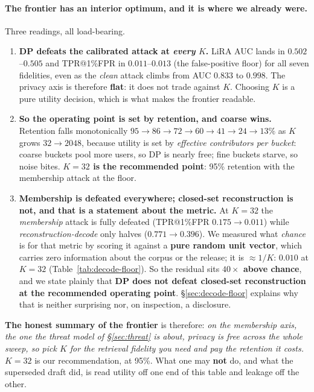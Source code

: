 \documentclass[pdflatex,sn-mathphys-num,iicol]{sn-jnl}
\theoremstyle{thmstyleone}%
\theoremstyle{thmstyletwo}%
\theoremstyle{thmstylethree}%
\newcommand{\secref}[1]{\S\ref{#1}}
\begin{document}
\paragraph{The frontier has an interior optimum, and it is where we already were.}
Three readings, all load-bearing.

\begin{enumerate}
  \item \textbf{DP defeats the calibrated attack at \emph{every} $K$.} LiRA AUC lands in
    $0.502$--$0.505$ and TPR@1\%FPR in $0.011$--$0.013$ (the false-positive floor)
    for all seven fidelities, even as the \emph{clean} attack climbs from AUC $0.833$ to
    $0.998$. The privacy axis is therefore \textbf{flat}: it does not trade against $K$.
    Choosing $K$ is a pure utility decision, which is what makes the frontier readable.

  \item \textbf{So the operating point is set by retention, and coarse wins.} Retention
    falls monotonically $95 \to 86 \to 72 \to 60 \to 41 \to 24 \to 13\%$ as $K$ grows
    $32 \to 2048$, because utility is set by \emph{effective contributors per bucket}:
    coarse buckets pool more users, so DP is nearly free; fine buckets starve, so noise
    bites. \textbf{$K = 32$ is the recommended point}: 95\% retention with the membership
    attack at the floor.

  \item \textbf{Membership is defeated everywhere; closed-set reconstruction is not, and
    that is a statement about the metric.} At $K = 32$ the \emph{membership} attack is
    fully defeated (TPR@1\%FPR $0.175 \to 0.011$) while \emph{reconstruction-decode} only
    halves ($0.771 \to 0.396$). We measured what \emph{chance} is for that metric by
    scoring it against a \textbf{pure random unit vector}, which carries zero information
    about the corpus or the release; it is $\approx 1/K$: $0.010$ at $K = 32$
    (Table~\ref{tab:decode-floor}). So the residual sits \textbf{$40\times$ above chance},
    and we state plainly that \textbf{DP does not defeat closed-set reconstruction at the
    recommended operating point}. \secref{sec:decode-floor} explains why that is neither
    surprising nor, on inspection, a disclosure.
\end{enumerate}

\noindent\textbf{The honest summary of the frontier} is therefore: \emph{on the membership
axis, the one the threat model of \secref{sec:threat} is about, privacy is free across
the whole sweep, so pick $K$ for the retrieval fidelity you need and pay the retention it
costs.} $K = 32$ is our recommendation, at 95\%. What one may \textbf{not} do, and what the
superseded draft did, is read utility off one end of this table and leakage off the other.
\end{document}
